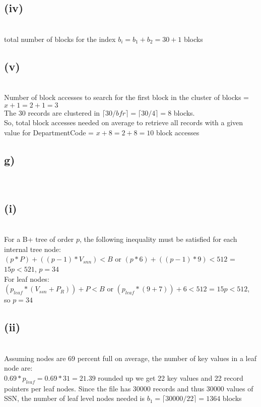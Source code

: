\documentclass[11pt]{article}
\theoremstyle{plain}
\theoremstyle{definition}
\begin{document}
\subsection*{(iv)}\\
total number of blocks for the index $b_i = b_1 + b_2 = 30 + 1$ blocks\\
\subsection*{(v)}\\
Number of block accesses to search for the first block in the cluster of blocks = $x + 1 = 2 + 1 = 3$\\

The 30 records are clustered in $\lceil 30/bfr \rceil = \lceil 30/4 \rceil = 8$ blocks.\\
So, total block accesses needed on average to retrieve all records with a given value for DepartmentCode = $x + 8 = 2 + 8 = 10$ block accesses



\subsection*{g)}\\
\subsection*{(i)}\\
For a B+ tree of order $p$, the following inequality must be satisfied for each internal tree node:\\
$(p*P) + ((p-1) * V_{snn}) < B$ or $(p*6) + ((p-1) * 9) < 512$ = $15p < 521$, $p = 34$\\
For leaf nodes:\\
$(p_{leaf} * (V_{ssn} + P_R)) + P < B$ or $(p_{leaf} * (9+7)) + 6 < 512$ = $15p < 512$, so $p = 34$\\
\subsection*{(ii)}\\
Assuming nodes are 69 percent full on average, the number of key values in a leaf node are:\\
$0.69 * p_{leaf} = 0.69 * 31 =21.39$ rounded up we get 22 key values and 22 record pointers per leaf nodes. Since the file has 30000 records and thus 30000 values of SSN, the number of leaf level nodes needed is $b_1 = \lceil 30000/22 \rceil = 1364$ blocks
\end{document}
